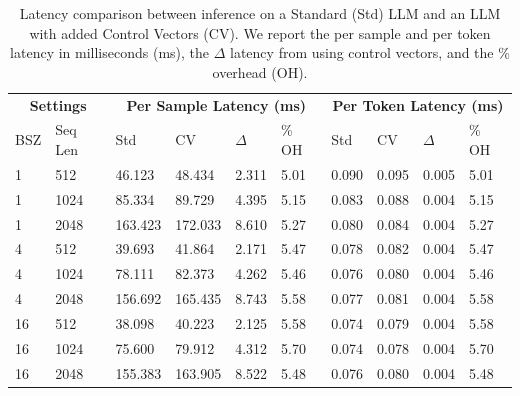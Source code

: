 \begin{table}[ht]
\centering
\footnotesize
\begin{tabular}{ll|llll|llll}
\multicolumn{2}{c|}{\textbf{Settings}}&
\multicolumn{4}{c|}{\textbf{Per Sample Latency (ms)}} &
\multicolumn{4}{c}{\textbf{Per Token Latency (ms)}} \\
BSZ & Seq Len &
Std & CV & $\Delta$ & \% OH &
Std & CV & $\Delta$ & \% OH \\
\hline
1  & 512  & 46.123 & 48.434 & 2.311 & 5.01 &
0.090 & 0.095 & 0.005 & 5.01 \\
1  & 1024 & 85.334 & 89.729 & 4.395 & 5.15 &
0.083 & 0.088 & 0.004 & 5.15 \\
1  & 2048 & 163.423 & 172.033 & 8.610 & 5.27 &
0.080 & 0.084 & 0.004 & 5.27 \\
\hline
4  & 512  & 39.693 & 41.864 & 2.171 & 5.47 &
0.078 & 0.082 & 0.004 & 5.47 \\
4  & 1024 & 78.111 & 82.373 & 4.262 & 5.46 &
0.076 & 0.080 & 0.004 & 5.46 \\
4  & 2048 & 156.692 & 165.435 & 8.743 & 5.58 &
0.077 & 0.081 & 0.004 & 5.58 \\
\hline
16 & 512  & 38.098 & 40.223 & 2.125 & 5.58 &
0.074 & 0.079 & 0.004 & 5.58 \\
16 & 1024 & 75.600 & 79.912 & 4.312 & 5.70 &
0.074 & 0.078 & 0.004 & 5.70 \\
16 & 2048 & 155.383 & 163.905 & 8.522 & 5.48 &
0.076 & 0.080 & 0.004 & 5.48 \\
\end{tabular}
\caption{Latency comparison between inference on a Standard (Std) LLM and an LLM with added Control Vectors (CV). We report the per sample and per token latency in milliseconds (ms), the $\Delta$ latency from using control vectors, and the \% overhead (OH).}
\label{tbl:latency-results}
\end{table}
